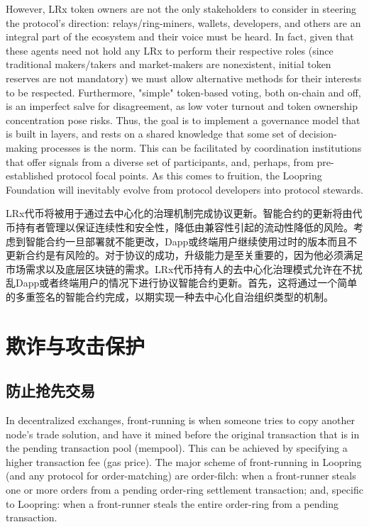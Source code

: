 \documentclass[UTF8,nofonts]{ctexart}
\begin{document}
\begin{multicols}{2}
However, LRx token owners are not the only stakeholders to consider in steering the protocol's direction: relays/ring-miners, wallets, developers, and others are an integral part of the ecosystem and their voice must be heard. In fact, given that these agents need not hold any LRx to perform their respective roles (since traditional makers/takers and market-makers are nonexistent, initial token reserves are not mandatory) we must allow alternative methods for their interests to be respected. Furthermore, "simple" token-based voting, both on-chain and off, is an imperfect salve for disagreement, as low voter turnout and token ownership concentration pose risks. Thus, the goal is to implement a governance model that is built in layers, and rests on a shared knowledge that some set of decision-making processes is the norm. This can be facilitated by coordination institutions that offer signals from a diverse set of participants, and, perhaps, from pre-established protocol focal points. As this comes to fruition, the Loopring Foundation will inevitably evolve from protocol developers into protocol stewards.

LRx代币将被用于通过去中心化的治理机制完成协议更新。智能合约的更新将由代币持有者管理以保证连续性和安全性，降低由兼容性引起的流动性降低的风险。考虑到智能合约一旦部署就不能更改，Dapp或终端用户继续使用过时的版本而且不更新合约是有风险的。对于协议的成功，升级能力是至关重要的，因为他必须满足市场需求以及底层区块链的需求。LRx代币持有人的去中心化治理模式允许在不扰乱Dapp或者终端用户的情况下进行协议智能合约更新。首先，这将通过一个简单的多重签名的智能合约完成，以期实现一种去中心化自治组织类型的机制。


\section{欺诈与攻击保护}

\subsection{防止抢先交易\label{sec:dual_authoring}}

In decentralized exchanges, front-running is when someone tries to copy another node's trade solution, and have it mined before the original transaction that is in the pending transaction pool (mempool). This can be achieved by specifying a higher transaction fee (gas price). The major scheme of front-running in Loopring (and any protocol for order-matching) are order-filch: when a front-runner steals one or more orders from a pending order-ring settlement transaction; and, specific to Loopring: when a front-runner steals the entire order-ring from a pending transaction.


\end{multicols}
\end{document}
